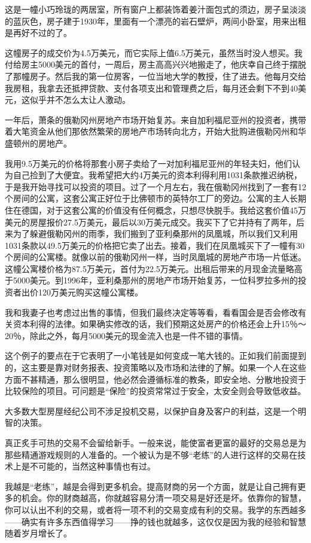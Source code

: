 这是一幢小巧玲珑的两居室，所有窗户上都装饰着姜汁面包式的须边，房子呈淡淡的蓝灰色，房子建于1930年，里面有一个漂亮的岩石壁炉，两间小卧室，用来出租是再好不过的了。

这幢房子的成交价为4.5万美元，而它实际上值6.5万美元，虽然当时没人想买。我付给房主5000美元的首付，一周后，房主高高兴兴地搬走了，他庆幸自己终于摆脱了那幢房子。然后我的第一位房客，一位当地大学的教授，住了进去。他每月交给我房租，我拿去还抵押贷款、支付各项支出和管理费之后，每月还会剩下不到40美元，这似乎并不怎么太让人激动。

一年后，萧条的俄勒冈州房地产市场开始复苏。来自加利福尼亚州的投资者，携带着大笔资金从他们那依然繁荣的房地产市场转向北方，开始大批购进俄勒冈州和华盛顿州的房地产。

我用9.5万美元的价格将那套小房子卖给了一对加利福尼亚州的年轻夫妇，他们认为自己捡到了大便宜。我希望把大约4万美元的资本利得利用1031条款推迟纳税，于是我开始寻找可以投资的项目。过了一个月左右，我在俄勒冈州找到了一套有12个房间的公寓，这套公寓正好位于比佛顿市的英特尔工厂的旁边。公寓的主人长期住在德国，对于这套公寓的价值没有任何概念，只想尽快脱手。我给这套价值45万美元的房屋报价27.5万美元，最后以30万美元成交。我买下了它并持有了两年，后来为了躲避俄勒冈州的雨季，我们搬到了亚利桑那州的凤凰城，所以我们又利用1031条款以49.5万美元的价格把它卖了出去。接着，我们在凤凰城买下了一幢有30个房间的公寓楼。就像以前的俄勒冈州一样，当时凤凰城的房地产市场一片低迷。这幢公寓楼价格为87.5万美元，首付为22.5万美元。出租后带来的月现金流量略高于5000美元。到1996年，亚利桑那州的房地产市场开始复苏，一位科罗拉多州的投资者出价120万美元购买这幢公寓楼。

我和我妻子也考虑过出售的事情，但我们最终决定等等看，看看国会是否会修改有关资本利得的法律。如果确实修改的话，我们预期这处房产的价格还会上升15％～20％，除此之外，每月5000美元的现金流入也是一件不错的事情。

这个例子的要点在于它表明了一小笔钱是如何变成一笔大钱的。正如我们前面提到的，这主要是靠对财务报表、投资策略以及市场和法律的了解。如果一个人在这些方面不甚精通，那么很明显，他必然会遵循标准的教条，即安全地、分散地投资于比较保险的项目。可问题是“保险”的投资常常过于安全，太安全则会导致低收益。

大多数大型房屋经纪公司不涉足投机交易，以保护自身及客户的利益，这是一个明智的决策。

真正炙手可热的交易不会留给新手。一般来说，能使富者更富的最好的交易总是为那些精通游戏规则的人准备的。一个被认为是不够“老练”的人进行这样的交易在技术上是不可能的，当然这种事情也有过。

我越是“老练”，越是会得到更多机会。提高财商的另一个方面，就是让自己拥有更多的机会。你的财商越高，你就越容易分清一项交易是好还是坏。依靠你的智慧，你可以认出不利的交易，或者将一项不利的交易变成有利的交易。我学的东西越多——确实有许多东西值得学习——挣的钱也就越多，这仅仅是因为我的经验和智慧随着岁月增长了。

